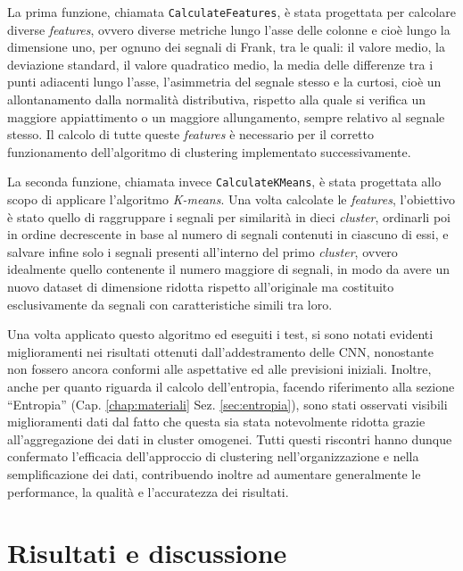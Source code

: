 \documentclass[12pt,italian]{report}
\begin{document}
	La prima funzione, chiamata \texttt{CalculateFeatures}, è stata progettata per calcolare diverse \textit{features}, ovvero diverse metriche lungo l'asse delle colonne e cioè lungo la dimensione uno, per ognuno dei segnali di Frank, tra le quali: il valore medio, la deviazione standard, il valore quadratico medio, la media delle differenze tra i punti adiacenti lungo l'asse, l'asimmetria del segnale stesso e la curtosi, cioè un allontanamento dalla normalità distributiva, rispetto alla quale si verifica un maggiore appiattimento o un maggiore allungamento, sempre relativo al segnale stesso. Il calcolo di tutte queste \textit{features} è necessario per il corretto funzionamento dell'algoritmo di clustering implementato successivamente.
	
	La seconda funzione, chiamata invece \texttt{CalculateKMeans}, è stata progettata allo scopo di applicare l'algoritmo \textit{K-means}. Una volta calcolate le \textit{features}, l'obiettivo è stato quello di raggruppare i segnali per similarità in dieci \textit{cluster}, ordinarli poi in ordine decrescente in base al numero di segnali contenuti in ciascuno di essi, e salvare infine solo i segnali presenti all'interno del primo \textit{cluster}, ovvero idealmente quello contenente il numero maggiore di segnali, in modo da avere un nuovo dataset di dimensione ridotta rispetto all'originale ma costituito esclusivamente da segnali con caratteristiche simili tra loro.
	
	Una volta applicato questo algoritmo ed eseguiti i test, si sono notati evidenti miglioramenti nei risultati ottenuti dall'addestramento delle CNN, nonostante non fossero ancora conformi alle aspettative ed alle previsioni iniziali. Inoltre, anche per quanto riguarda il calcolo dell'entropia, facendo riferimento alla sezione ``Entropia'' (Cap. \ref{chap:materiali} Sez. \ref{sec:entropia}), sono stati osservati visibili miglioramenti dati dal fatto che questa sia stata notevolmente ridotta grazie all'aggregazione dei dati in cluster omogenei. Tutti questi riscontri hanno dunque confermato l'efficacia dell'approccio di clustering nell'organizzazione e nella semplificazione dei dati, contribuendo inoltre ad aumentare generalmente le performance, la qualità e l'accuratezza dei risultati.
	
	
	\chapter{Risultati e discussione}
	\label{chap:risultati}
	
\end{document}
